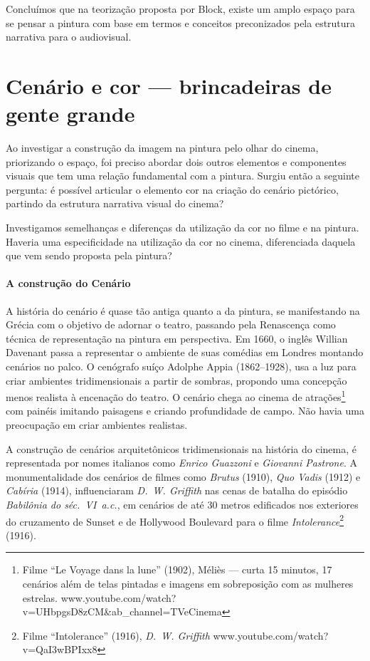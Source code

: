 Concluímos que na teorização proposta por Block, existe um amplo espaço
para se pensar a pintura com base em termos e conceitos preconizados
pela estrutura narrativa para o audiovisual.

\section{Cenário e cor --- brincadeiras de gente grande}%
\label{sec:cenario-e-cor-brincadeiras-de-gente-grande}

Ao investigar a construção da imagem na pintura pelo olhar do cinema,
priorizando o espaço, foi preciso abordar dois outros elementos e
componentes visuais que tem uma relação fundamental com a pintura.
Surgiu então a seguinte pergunta: é possível articular o elemento cor
na criação do cenário pictórico, partindo da estrutura narrativa visual
do cinema?

Investigamos semelhanças e diferenças da utilização da cor no filme e
na pintura. Haveria uma especificidade na utilização da cor no cinema,
diferenciada daquela que vem sendo proposta pela pintura?

\paragraph{A construção do Cenário} A história do cenário é quase
tão antiga quanto a da pintura, se
manifestando na Grécia com o objetivo de adornar o teatro, passando
pela Renascença como técnica de representação na pintura em
perspectiva. Em 1660, o inglês Willian Davenant passa a representar o
ambiente de suas comédias em Londres montando cenários no palco. O
cenógrafo suíço Adolphe Appia (1862--1928), usa a luz para criar
ambientes tridimensionais a partir de sombras, propondo uma concepção
menos realista à encenação do teatro. O cenário chega ao cinema de
atrações\footnote{Filme \enquote{Le Voyage dans la lune} (1902),
	Méliès --- curta 15 minutos, 17 cenários além de telas pintadas e imagens
	em sobreposição com as mulheres estrelas.
	www.youtube.com/watch?v=UHbpgsD8zCM\&ab\_channel=TVeCinema} com painéis
imitando paisagens e criando profundidade de campo. Não havia uma
preocupação em criar ambientes realistas.

A construção de cenários arquitetônicos tridimensionais na história do
cinema, é representada por nomes italianos como \emph{Enrico Guazzoni}
e \emph{Giovanni Pastrone}. A monumentalidade dos cenários de filmes
como \emph{Brutus} (1910), \emph{Quo Vadis} (1912) e \emph{Cabíria}
(1914), influenciaram \emph{D.~W. Griffith} nas cenas de batalha do
episódio \emph{Babilônia do séc.~VI~a.c.}, em cenários de até 30 metros
edificados nos exteriores do cruzamento de Sunset e de Hollywood
Boulevard para o filme \emph{Intolerance}\footnote{Filme
	\enquote{Intolerance} (1916), \emph{D.~W. Griffith}
	www.youtube.com/watch?v=QaI3wBPIxx8} (1916).

